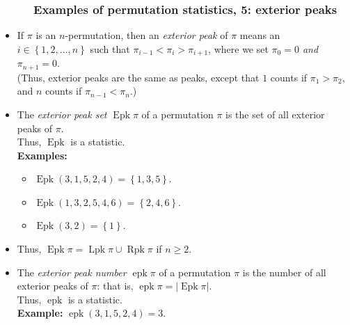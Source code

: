 \documentclass{beamer}
\newcommand{\Lpk}{\operatorname{Lpk}}
\newcommand{\Rpk}{\operatorname{Rpk}}
\newcommand{\Epk}{\operatorname{Epk}}
\newcommand{\epk}{\operatorname{epk}}
\newcommand{\fti}[1]{\frametitle{\ \ \ \ \ #1}}
\newcommand{\set}[1]{\left\{ #1 \right\}}
\newcommand{\abs}[1]{\left| #1 \right|}
\newcommand{\tup}[1]{\left( #1 \right)}
\newcommand{\defn}[1]{{\color{darkred}\emph{#1}}} %
\theoremstyle{plain}
\begin{document}
\begin{frame}
\fti{Examples of permutation statistics, 5: exterior peaks}

\begin{itemize}

\item If $\pi$ is an $n$-permutation, then an \defn{exterior peak} of $\pi$
      means an $i \in \set{1, 2, \ldots, n}$ such that
      $\pi_{i-1} < \pi_i > \pi_{i+1}$, where we set \defn{$\pi_0 = 0$ and $\pi_{n+1} = 0$}. \\
      (Thus, exterior peaks are the same as peaks, except that
      $1$ counts if $\pi_1 > \pi_2$, and
      $n$ counts if $\pi_{n-1} < \pi_n$.)

\item The \defn{exterior peak set $\Epk \pi$} of a permutation $\pi$ is
      the set of all exterior peaks of $\pi$. \\
      Thus, \defn{$\Epk$} is a statistic. \\
      \textbf{Examples:}
      \begin{itemize}
      \item $\Epk \tup{3, 1, 5, 2, 4} = \set{1, 3, 5}$.
      \item $\Epk \tup{1, 3, 2, 5, 4, 6} = \set{2, 4, 6}$.
      \item $\Epk \tup{3, 2} = \set{1}$.
      \end{itemize}

\item Thus, $\Epk \pi = \Lpk \pi \cup \Rpk \pi$ if $n \geq 2$.

\item The \defn{exterior peak number $\epk \pi$} of a permutation $\pi$
      is the number of all exterior peaks of $\pi$: that is,
      $\epk \pi = \abs{\Epk \pi}$. \\
      Thus, \defn{$\epk$} is a statistic. \\
      \textbf{Example:} $\epk \tup{3, 1, 5, 2, 4} = 3$.

\end{itemize}
\vspace{10cm}
\end{frame}
\end{document}
